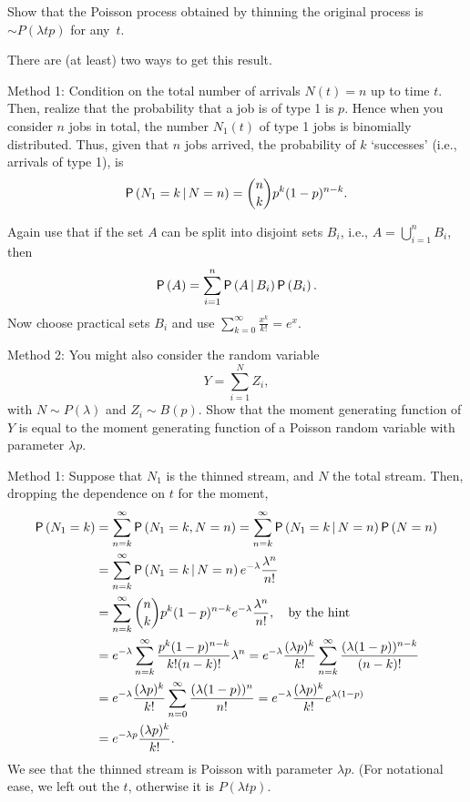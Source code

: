 \begin{exercise}\label{ex:1}
Show that the Poisson process obtained by thinning the original
  process is $\sim P(\lambda t p)$ for any~$t$.
  \begin{hint}
There are (at least) two ways to get this result. 

Method 1:  Condition on the total number of arrivals $N(t)=n$ up to time
      $t$. Then, realize that the probability that a job is of type 1 is $p$. Hence when you consider $n$ jobs in
      total, the number $N_1(t)$ of type 1 jobs is binomially distributed. Thus, given that $n$ jobs arrived, the probability of $k$ `successes' (i.e., arrivals of type 1), is 
      \begin{equation*}
        \P{N_1=k \given N = n} = {n \choose k} p^k (1-p)^{n-k}.
      \end{equation*}

      Again use that if the set $A$ can be split into disjoint sets
      $B_i$, i.e., $A=\bigcup_{i=1}^n B_i$, then
    \begin{equation*}
      \P{A} = \sum_{i=1}^n \P{A\given B_i} \P{B_i}.
    \end{equation*}
Now choose practical sets $B_i$ and use $\sum_{k=0}^{\infty} \frac{x^k}{k!} = e^x$. 

Method 2: You might also consider the random variable 
  \begin{equation*}
    Y = \sum_{i=1}^N Z_i,
  \end{equation*}
  with $N\sim P(\lambda)$ and $Z_i\sim B(p)$. Show that the moment
  generating function of $Y$ is equal to the moment generating
  function of a Poisson random variable with parameter $\lambda p$.
  \end{hint}
    \begin{solution}
Method 1: Suppose that  $N_1$ is the  thinned stream, and $N$ the total stream. Then, dropping the dependence on $t$ for the moment,
\begin{align*}
    \P{N_1 = k}
&= \sum_{n=k}^\infty \P{N_1 =k, N = n} 
= \sum_{n=k}^\infty \P{N_1 =k\given N = n}\P{N=n} \\
&= \sum_{n=k}^\infty \P{N_1 =k\given N = n}e^{-\lambda} \frac{\lambda^n}{n!}\\
&= \sum_{n=k}^\infty {n \choose k} p^k (1-p)^{n-k} e^{-\lambda} \frac{\lambda^n}{n!}, \quad\text{by the hint}\\
&= e^{-\lambda}\sum_{n=k}^\infty  \frac{p^k (1-p)^{n-k}}{k! (n-k)!} \lambda^n
= e^{-\lambda} \frac{(\lambda p)^k}{k!} \sum_{n=k}^\infty  \frac{(\lambda (1-p))^{n-k}}{(n-k)!}\\
&= e^{-\lambda} \frac{(\lambda p)^k}{k!} \sum_{n=0}^\infty  \frac{(\lambda (1-p))^{n}}{n!}
= e^{-\lambda} \frac{(\lambda p)^k}{k!} e^{\lambda(1-p)} \\
&= e^{-\lambda p} \frac{(\lambda p)^k}{k!}.
\end{align*}
We see that the thinned stream is Poisson with parameter $\lambda p$. (For notational ease, we left out the $t$, otherwise it is $P(\lambda t p)$. 


\end{solution}
\end{exercise}
